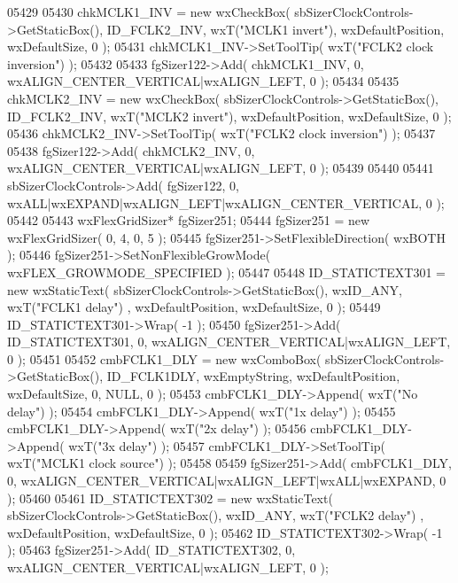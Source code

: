 \begin{DoxyCode}
05429     
05430     chkMCLK1_INV = \textcolor{keyword}{new} wxCheckBox( sbSizerClockControls->GetStaticBox(), 
      ID_FCLK2_INV, wxT(\textcolor{stringliteral}{"MCLK1 invert"}), wxDefaultPosition, wxDefaultSize, 0 );
05431     chkMCLK1_INV->SetToolTip( wxT(\textcolor{stringliteral}{"FCLK2 clock inversion"}) );
05432     
05433     fgSizer122->Add( chkMCLK1_INV, 0, wxALIGN\_CENTER\_VERTICAL|wxALIGN\_LEFT, 0 );
05434     
05435     chkMCLK2_INV = \textcolor{keyword}{new} wxCheckBox( sbSizerClockControls->GetStaticBox(), 
      ID_FCLK2_INV, wxT(\textcolor{stringliteral}{"MCLK2 invert"}), wxDefaultPosition, wxDefaultSize, 0 );
05436     chkMCLK2_INV->SetToolTip( wxT(\textcolor{stringliteral}{"FCLK2 clock inversion"}) );
05437     
05438     fgSizer122->Add( chkMCLK2_INV, 0, wxALIGN\_CENTER\_VERTICAL|wxALIGN\_LEFT, 0 );
05439     
05440     
05441     sbSizerClockControls->Add( fgSizer122, 0, wxALL|wxEXPAND|wxALIGN\_LEFT|wxALIGN\_CENTER\_VERTICAL, 0 );
05442     
05443     wxFlexGridSizer* fgSizer251;
05444     fgSizer251 = \textcolor{keyword}{new} wxFlexGridSizer( 0, 4, 0, 5 );
05445     fgSizer251->SetFlexibleDirection( wxBOTH );
05446     fgSizer251->SetNonFlexibleGrowMode( wxFLEX\_GROWMODE\_SPECIFIED );
05447     
05448     ID_STATICTEXT301 = \textcolor{keyword}{new} wxStaticText( sbSizerClockControls->GetStaticBox(), wxID\_ANY, wxT(\textcolor{stringliteral}{"FCLK1 delay"})
      , wxDefaultPosition, wxDefaultSize, 0 );
05449     ID_STATICTEXT301->Wrap( -1 );
05450     fgSizer251->Add( ID_STATICTEXT301, 0, wxALIGN\_CENTER\_VERTICAL|wxALIGN\_LEFT, 0 );
05451     
05452     cmbFCLK1_DLY = \textcolor{keyword}{new} wxComboBox( sbSizerClockControls->GetStaticBox(), 
      ID_FCLK1DLY, wxEmptyString, wxDefaultPosition, wxDefaultSize, 0, NULL, 0 );
05453     cmbFCLK1_DLY->Append( wxT(\textcolor{stringliteral}{"No delay"}) );
05454     cmbFCLK1_DLY->Append( wxT(\textcolor{stringliteral}{"1x delay"}) );
05455     cmbFCLK1_DLY->Append( wxT(\textcolor{stringliteral}{"2x delay"}) );
05456     cmbFCLK1_DLY->Append( wxT(\textcolor{stringliteral}{"3x delay"}) );
05457     cmbFCLK1_DLY->SetToolTip( wxT(\textcolor{stringliteral}{"MCLK1 clock source"}) );
05458     
05459     fgSizer251->Add( cmbFCLK1_DLY, 0, wxALIGN\_CENTER\_VERTICAL|wxALIGN\_LEFT|wxALL|wxEXPAND, 0 );
05460     
05461     ID_STATICTEXT302 = \textcolor{keyword}{new} wxStaticText( sbSizerClockControls->GetStaticBox(), wxID\_ANY, wxT(\textcolor{stringliteral}{"FCLK2 delay"})
      , wxDefaultPosition, wxDefaultSize, 0 );
05462     ID_STATICTEXT302->Wrap( -1 );
05463     fgSizer251->Add( ID_STATICTEXT302, 0, wxALIGN\_CENTER\_VERTICAL|wxALIGN\_LEFT, 0 );

\end{DoxyCode}
